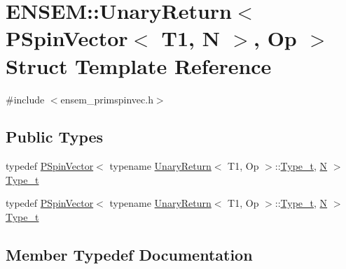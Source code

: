 \hypertarget{structENSEM_1_1UnaryReturn_3_01PSpinVector_3_01T1_00_01N_01_4_00_01Op_01_4}{}\section{E\+N\+S\+EM\+:\+:Unary\+Return$<$ P\+Spin\+Vector$<$ T1, N $>$, Op $>$ Struct Template Reference}
\label{structENSEM_1_1UnaryReturn_3_01PSpinVector_3_01T1_00_01N_01_4_00_01Op_01_4}


{\ttfamily \#include $<$ensem\+\_\+primspinvec.\+h$>$}

\subsection*{Public Types}
\begin{DoxyCompactItemize}
\item 
typedef \mbox{\hyperlink{classENSEM_1_1PSpinVector}{P\+Spin\+Vector}}$<$ typename \mbox{\hyperlink{structENSEM_1_1UnaryReturn}{Unary\+Return}}$<$ T1, Op $>$\+::\mbox{\hyperlink{structENSEM_1_1UnaryReturn_3_01PSpinVector_3_01T1_00_01N_01_4_00_01Op_01_4_aa89ab5c0224d9343b5849e81a52271d4}{Type\+\_\+t}}, \mbox{\hyperlink{operator__name__util_8cc_a7722c8ecbb62d99aee7ce68b1752f337}{N}} $>$ \mbox{\hyperlink{structENSEM_1_1UnaryReturn_3_01PSpinVector_3_01T1_00_01N_01_4_00_01Op_01_4_aa89ab5c0224d9343b5849e81a52271d4}{Type\+\_\+t}}
\item 
typedef \mbox{\hyperlink{classENSEM_1_1PSpinVector}{P\+Spin\+Vector}}$<$ typename \mbox{\hyperlink{structENSEM_1_1UnaryReturn}{Unary\+Return}}$<$ T1, Op $>$\+::\mbox{\hyperlink{structENSEM_1_1UnaryReturn_3_01PSpinVector_3_01T1_00_01N_01_4_00_01Op_01_4_aa89ab5c0224d9343b5849e81a52271d4}{Type\+\_\+t}}, \mbox{\hyperlink{operator__name__util_8cc_a7722c8ecbb62d99aee7ce68b1752f337}{N}} $>$ \mbox{\hyperlink{structENSEM_1_1UnaryReturn_3_01PSpinVector_3_01T1_00_01N_01_4_00_01Op_01_4_aa89ab5c0224d9343b5849e81a52271d4}{Type\+\_\+t}}
\end{DoxyCompactItemize}


\subsection{Member Typedef Documentation}
\mbox{\label{structENSEM_1_1UnaryReturn_3_01PSpinVector_3_01T1_00_01N_01_4_00_01Op_01_4_aa89ab5c0224d9343b5849e81a52271d4}} 
